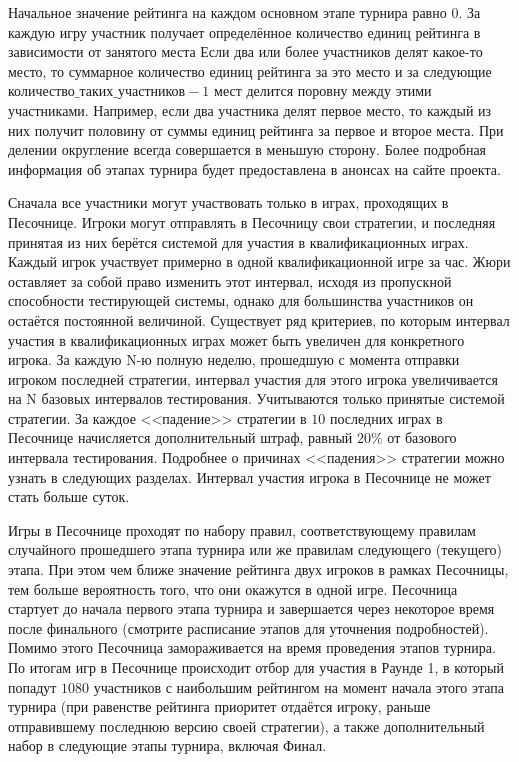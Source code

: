 Начальное значение рейтинга на каждом основном этапе турнира равно $0$.
За каждую игру участник получает определённое количество единиц рейтинга в зависимости от занятого места
Если два или более участников делят какое-то место,
то суммарное количество единиц рейтинга за это место и за следующие
$\texttt{количество\_таких\_участников}-1$ мест делится поровну между этими участниками.
Например, если два участника делят первое место,
то каждый из них получит половину от суммы единиц рейтинга за первое и второе места.
При делении округление всегда совершается в меньшую сторону.
Более подробная информация об этапах турнира будет предоставлена в анонсах на сайте проекта.

Сначала все участники могут участвовать только в играх, проходящих в Песочнице.
Игроки могут отправлять в Песочницу свои стратегии,
и последняя принятая из них берётся системой для участия в квалификационных играх.
Каждый игрок участвует примерно в одной квалификационной игре за час.
Жюри оставляет за собой право изменить этот интервал, исходя из пропускной способности тестирующей системы,
однако для большинства участников он остаётся постоянной величиной.
Существует ряд критериев, по которым интервал участия в квалификационных играх может быть увеличен для конкретного игрока.
За каждую N-ю полную неделю, прошедшую с момента отправки игроком последней стратегии,
интервал участия для этого игрока увеличивается на N базовых интервалов тестирования.
Учитываются только принятые системой стратегии.
За каждое <<падение>> стратегии в $10$ последних играх в Песочнице начисляется дополнительный штраф,
равный $20\%$ от базового интервала тестирования.
Подробнее о причинах <<падения>> стратегии можно узнать в следующих разделах.
Интервал участия игрока в Песочнице не может стать больше суток.

Игры в Песочнице проходят по набору правил,
соответствующему правилам случайного прошедшего этапа турнира или же правилам следующего (текущего) этапа.
При этом чем ближе значение рейтинга двух игроков в рамках Песочницы,
тем больше вероятность того, что они окажутся в одной игре.
Песочница стартует до начала первого этапа турнира и завершается через некоторое время после финального
(смотрите расписание этапов для уточнения подробностей).
Помимо этого Песочница замораживается на время проведения этапов турнира.
По итогам игр в Песочнице происходит отбор для участия в Раунде 1,
в который попадут $1080$ участников с наибольшим рейтингом на момент начала этого этапа турнира
(при равенстве рейтинга приоритет отдаётся игроку, раньше отправившему последнюю версию своей стратегии),
а также дополнительный набор в следующие этапы турнира, включая Финал.


